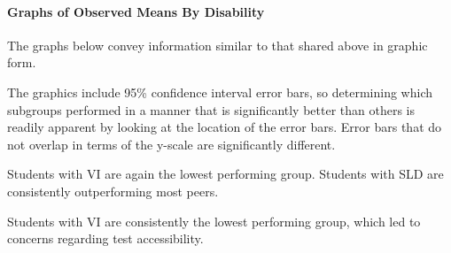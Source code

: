 \documentclass[]{article}
\let\oldparagraph\paragraph
\renewcommand{\paragraph}[1]{\oldparagraph{#1}\mbox{}}
\begin{document}
\clearpage

\paragraph{Graphs of Observed Means By
Disability}\label{graphs-of-observed-means-by-disability}

The graphs below convey information similar to that shared above in
graphic form.

The graphics include 95\% confidence interval error bars, so determining
which subgroups performed in a manner that is significantly better than
others is readily apparent by looking at the location of the error bars.
Error bars that do not overlap in terms of the y-scale are significantly
different.

Students with VI are again the lowest performing group. Students with
SLD are consistently outperforming most peers.

Students with VI are consistently the lowest performing group, which led
to concerns regarding test accessibility.
\end{document}
